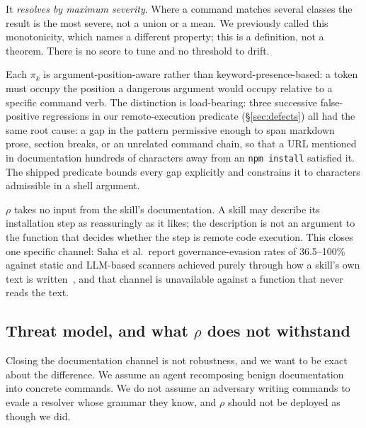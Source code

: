 \documentclass[10pt]{article}
\begin{document}
It \emph{resolves by maximum severity}. Where a command matches several classes the
result is the most severe, not a union or a mean. We previously called this
monotonicity, which names a different property; this is a definition, not a theorem.
There is no score to tune and no threshold to drift.

Each $\pi_k$ is argument-position-aware rather than keyword-presence-based: a token
must occupy the position a dangerous argument would occupy relative to a specific
command verb. The distinction is load-bearing: three successive false-positive
regressions in our remote-execution predicate (\S\ref{sec:defects}) all had the same
root cause: a gap in the pattern permissive enough to span markdown prose, section
breaks, or an unrelated command chain, so that a URL mentioned in documentation
hundreds of characters away from an \texttt{npm install} satisfied it. The shipped
predicate bounds every gap explicitly and constrains it to characters admissible in
a shell argument.

$\rho$ takes no input from the skill's documentation. A skill may describe its
installation step as reassuringly as it likes; the description is not an argument to
the function that decides whether the step is remote code execution. This closes one
specific channel: Saha et al.\ report governance-evasion rates of 36.5--100\% against
static and LLM-based scanners achieved purely through how a skill's own text is
written~\cite{skillmd2026}, and that channel is unavailable against a function that
never reads the text.

\subsection{Threat model, and what $\rho$ does not withstand}
\label{sec:threat}

Closing the documentation channel is not robustness, and we want to be exact about
the difference. We assume an agent recomposing benign documentation into concrete
commands. We do not assume an adversary writing commands to evade a resolver whose
grammar they know, and $\rho$ should not be deployed as though we did.
\end{document}
